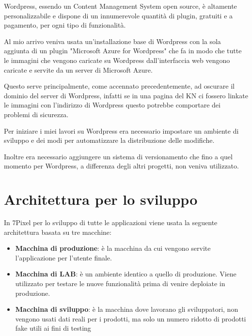 


Wordpress, essendo un Content Management System open source, è altamente personalizzabile e dispone
di un innumerevole quantità di plugin, gratuiti e a pagamento, per ogni tipo di funzionalità.

Al mio arrivo veniva usata un'installazione base di Wordpress con la sola aggiunta di un plugin "Microsoft Azure 
for Wordpress" che fa in modo che tutte le immagini che vengono caricate su Wordpress dall'interfaccia web
vengono caricate e servite da un server di Microsoft Azure.

Questo serve principalmente, come accennato precedentemente, ad oscurare il dominio del server di Wordpress,
infatti se in una pagina del KN ci fossero linkate le immagini con l'indirizzo di Wordpress questo potrebbe 
comportare dei problemi di sicurezza.

Per iniziare i miei lavori su Wordpress era necessario impostare un ambiente di sviluppo e dei modi per automatizzare
la distribuzione delle modifiche.

Inoltre era necessario aggiungere un sistema di versionamento che fino a quel momento per Wordpress, a differenza
degli altri progetti, non veniva utilizzato.

\section{Architettura per lo sviluppo}

In 7Pixel per lo sviluppo di tutte le applicazioni viene usata la seguente architettura basata su tre macchine:
\begin{itemize}
\item {\bf Macchina di produzione}: è la macchina da cui vengono servite l'applicazione per l'utente finale.
\item {\bf Macchina di LAB}: è un ambiente identico a quello di produzione. Viene utilizzato per testare le nuove funzionalità
prima di venire deploiate in produzione.
\item {\bf Macchina di sviluppo}: è la macchina dove lavorano gli sviluppatori, non vengono usati dati reali per i prodotti, 
ma solo un numero ridotto di prodotti fake utili ai fini di testing
\end{itemize}


